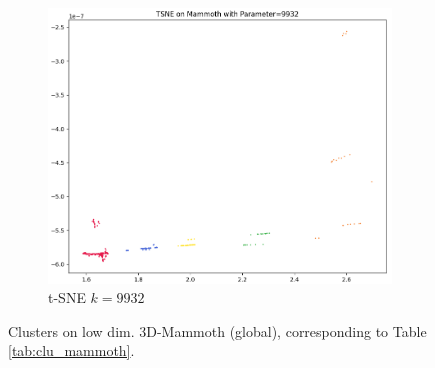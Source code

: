 \begin{figure}[!]
     \hfill
     \begin{subfigure}[t]{0.49\columnwidth}
    	\centering
    	\includegraphics[width=\columnwidth]{images/KMEANS_5_TSNE_9932.png}
    	\caption{t-SNE $k=9932$}
        \label{fig:KMEANS_5_TSNE_9932}
    \end{subfigure}
     \caption[Clusters on low dim. 3D-Mammoth (global)]{Clusters on low dim. 3D-Mammoth (global), corresponding to Table \ref{tab:clu_mammoth}.}
    \label{fig:global_clu_mammoth}
\end{figure}

